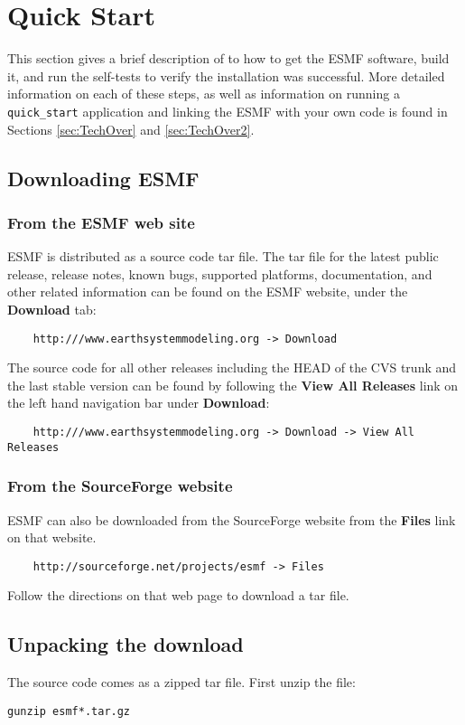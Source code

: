 \section{Quick Start}
\label{sec:QuickStart}

This section gives a brief
description of to how to get the ESMF software, build it, 
and run the self-tests to verify the installation was successful.
More detailed information on each of these steps, as well as
information on running a {\tt quick\_start} application and linking
the ESMF with your own code is found in Sections \ref{sec:TechOver} 
and \ref{sec:TechOver2}.  

\subsection{Downloading ESMF}
\subsubsection{From the ESMF web site}
\label{sec:download}
ESMF is distributed as a source code tar file.  The tar file for the latest
public release, release notes, 
known bugs, supported platforms, documentation, and other related information 
can be found on the ESMF website, under the {\bf Download} tab:
\begin{verbatim}
    http:///www.earthsystemmodeling.org -> Download
\end{verbatim}
The source code for all other releases including the HEAD of the CVS trunk and the
last stable version can be found by following the {\bf View All Releases} link on the left hand navigation bar under {\bf Download}:
\begin{verbatim}
    http:///www.earthsystemmodeling.org -> Download -> View All Releases
\end{verbatim}

\subsubsection{From the SourceForge website}
ESMF can also be downloaded from the SourceForge website
from the {\bf Files} link on that website.
\begin{verbatim}
    http://sourceforge.net/projects/esmf -> Files
\end{verbatim}
Follow the directions on that web page to download a tar file.  

\subsection{Unpacking the download}
The source code comes as a zipped tar file. First unzip the file:
\begin{verbatim}
gunzip esmf*.tar.gz
\end{verbatim}


